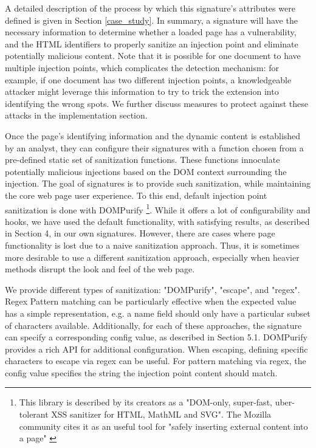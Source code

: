 A detailed description of the process by which this signature's attributes were defined is given in Section \ref{case_study}. In summary, a signature will have the necessary information to determine whether a loaded page has a vulnerability, and the HTML identifiers to properly sanitize an injection point and eliminate potentially malicious content. Note that it is possible for one document to have multiple injection points, which complicates the detection mechanism: for example, if one document has two different injection points, a knowledgeable attacker might leverage this information to try to trick the extension into identifying the wrong spots. We further discuss measures to protect against these attacks in the implementation section.
  
Once the page's identifying information and the dynamic content is established by an analyst, they can configure their signatures with a function chosen from a pre-defined static set of sanitization functions. These functions innoculate potentially malicious injections based on the DOM context surrounding the injection. The goal of signatures is to provide such sanitization, while maintaining the core web page user experience. To this end, default injection point sanitization is done with DOMPurify \cite{10.1007/978-3-319-66399-9_7} \footnote{This library is described by its creators as a "DOM-only, super-fast, uber-tolerant XSS sanitizer for HTML, MathML and SVG". The Mozilla community cites it as an useful tool for "safely inserting external content into a page" \cite{safecontent}}. While it offers a lot of configurability and hooks, we have used the default functionality, with satisfying results, as described in Section 4, in our own signatures. However, there are cases where page functionality is lost due to a naive sanitization approach. Thus, it is sometimes more desirable to use a different sanitization approach, especially when heavier methods disrupt the look and feel of the web page.
 
  We provide different types of sanitization: "DOMPurify", "escape", and "regex". Regex Pattern matching can be particularly effective when the expected value has a simple representation, e.g. a name field should only have a particular subset of characters available. Additionally, for each of these approaches, the signature can specify a corresponding config value, as described in Section 5.1. DOMPurify provides a rich API for additional configuration. When escaping, defining specific characters to escape via regex can be useful. For pattern matching via regex, the config value specifies the string the injection point content should match.
 
